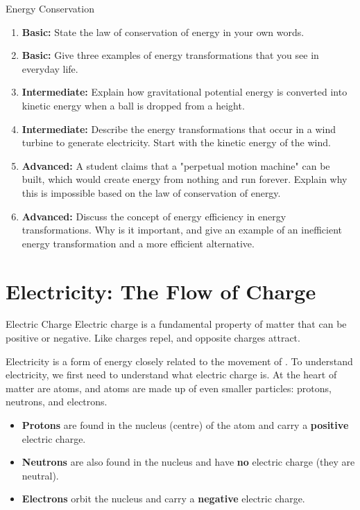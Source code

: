 \begin{tieredquestions}{Energy Conservation}

\begin{enumerate}
    \item \textbf{Basic:} State the law of conservation of energy in your own words.
    \item \textbf{Basic:} Give three examples of energy transformations that you see in everyday life.
    \item \textbf{Intermediate:} Explain how gravitational potential energy is converted into kinetic energy when a ball is dropped from a height.
    \item \textbf{Intermediate:}  Describe the energy transformations that occur in a wind turbine to generate electricity. Start with the kinetic energy of the wind.
    \item \textbf{Advanced:}  A student claims that a "perpetual motion machine" can be built, which would create energy from nothing and run forever. Explain why this is impossible based on the law of conservation of energy.
    \item \textbf{Advanced:} Discuss the concept of energy efficiency in energy transformations.  Why is it important, and give an example of an inefficient energy transformation and a more efficient alternative.
\end{enumerate}

\end{tieredquestions}

\section{Electricity: The Flow of Charge}

\begin{keyconcept}{Electric Charge}
Electric charge is a fundamental property of matter that can be positive or negative.  Like charges repel, and opposite charges attract.
\end{keyconcept}

Electricity is a form of energy closely related to the movement of .  To understand electricity, we first need to understand what electric charge is.  At the heart of matter are atoms, and atoms are made up of even smaller particles: protons, neutrons, and electrons.

\begin{itemize}
    \item \textbf{Protons} are found in the nucleus (centre) of the atom and carry a \textbf{positive} electric charge.
    \item \textbf{Neutrons} are also found in the nucleus and have \textbf{no} electric charge (they are neutral).
    \item \textbf{Electrons} orbit the nucleus and carry a \textbf{negative} electric charge.
\end{itemize}


